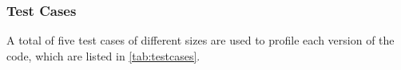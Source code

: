 \documentclass[9pt,twocolumn]{scrartcl}
\begin{document}
%
%

\subsubsection{Test Cases}
\label{subsubsec:testcases}
A total of five test cases of different sizes are used to profile each version of the code, which are listed in \autoref{tab:testcases}.
\end{document}
